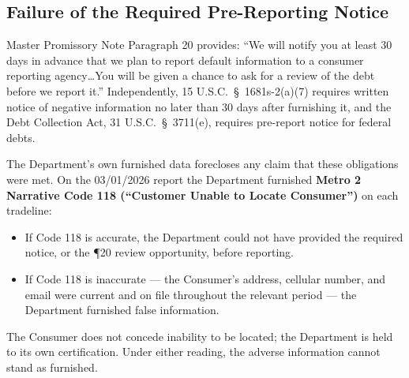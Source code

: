\subsection*{Failure of the Required Pre-Reporting Notice}

Master Promissory Note Paragraph 20 provides: ``We will notify you at least 30 days in advance that we plan to report default information to a consumer reporting agency\ldots You will be given a chance to ask for a review of the debt before we report it.'' Independently, 15 U.S.C.\ \S~1681s-2(a)(7) requires written notice of negative information no later than 30 days after furnishing it, and the Debt Collection Act, 31 U.S.C.\ \S~3711(e), requires pre-report notice for federal debts.

The Department's own furnished data forecloses any claim that these obligations were met. On the 03/01/2026 report the Department furnished \textbf{Metro 2 Narrative Code 118 (``Customer Unable to Locate Consumer'')} on each tradeline:
\begin{itemize}[noitemsep]
  \item If Code 118 is accurate, the Department could not have provided the required notice, or the ¶20 review opportunity, before reporting.
  \item If Code 118 is inaccurate --- the Consumer's address, cellular number, and email were current and on file throughout the relevant period --- the Department furnished false information.
\end{itemize}
The Consumer does not concede inability to be located; the Department is held to its own certification. Under either reading, the adverse information cannot stand as furnished.
